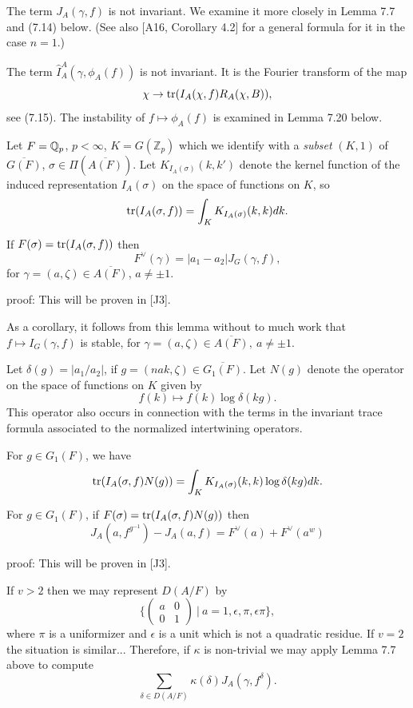 The term $J_A(\gamma,f)$ is not invariant. We examine it
more closely in Lemma 7.7 and (7.14) below.
(See also [A16, Corollary 4.2] for a general formula for it
in the case $n=1$.)

The term $\hat{I}_A^A(\gamma,\phi_A(f))$ is not invariant. It is the
Fourier transform of the map
\[
\chi\rightarrow {\rm tr}(I_A(\chi,f)R_A(\chi,B)),
\]
see (7.15). The instability of $f\longmapsto \phi_A(f)$ is
examined in Lemma 7.20 below.

Let $F=\mathbb{Q} _p$, $p<\infty$, $K=G({\mathbb{Z}}_p)$ which we
identify with a {\em subset} $(K,1)$ of $\overline{G(F)}$,
$\sigma\in \Pi(\overline{A(F)})$. Let $K_{I_A(\sigma)}(k,k')$
denote the kernel function of the induced representation
$I_A(\sigma)$ on the space of functions on $K$, so
\begin{equation}
{\rm tr}(I_A(\sigma,f))
=\int_K K_{I_A(\sigma)}(k,k)dk .
\end{equation}

\begin{lemma}
If $F(\sigma)={\rm tr}(I_A(\sigma,f))$ then
\[
F^\vee(\gamma)
=|a_1-a_2|J_G(\gamma,f),
\]
for $\gamma =(a,\zeta)\in \overline{A(F)}$, $a\not= \pm 1$.
\end{lemma}

proof: This will be proven in [J3].

As a corollary, it follows from this lemma without to much work
that $f\longmapsto I_G(\gamma,f)$ is stable, for
$\gamma =(a,\zeta)\in \overline{A(F)},\ a\not= \pm 1$.

Let $\delta(g)=|a_1/a_2|$, if $g=(nak,\zeta)\in \overline{G_1(F)}$. Let
$N(g)$ denote the operator on the space of functions on $K$ given by
\[
f(k)\longmapsto f(k)\log\delta(kg).
\]
This operator also occurs in connection with the terms in the
invariant trace formula associated to the normalized intertwining
operators.

\begin{lemma}
For $g\in G_1(F)$, we have
\[
{\rm tr}(I_A(\sigma,f)N(g))
=\int_K K_{I_A(\sigma)}(k,k)\log\delta(kg)dk.
\]
\end{lemma}

\begin{lemma}
For $g\in G_1(F)$, if
$F(\sigma)={\rm tr}(I_A(\sigma,f)N(g))$ then
\[
J_A(a,f^{g^{-1}})-J_A(a,f)
=F^\vee(a)+F^\vee(a^w)
\]
\end{lemma}
proof: This will be proven in [J3].

If $v>2$ then we may represent $D(A/F)$ by
\[
\{
\left(
\begin{array}{cc}
a&0\\
0&1
\end{array}
\right)\ |\ a=1,\epsilon, \pi, \epsilon\pi \},
\]
where $\pi$ is a uniformizer and $\epsilon$ is a unit
which is not a quadratic residue. If $v=2$ the situation is similar...
Therefore, if $\kappa$ is non-trivial
we may apply Lemma 7.7 above to compute
\[
\sum_{\delta\in D(A/F)}
\kappa(\delta)J_A(\gamma,f^\delta).
\]

